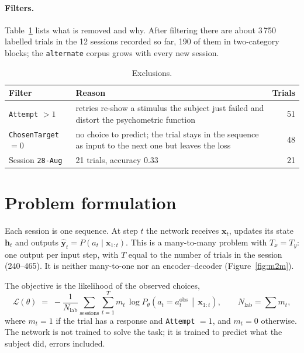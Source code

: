\documentclass[11pt,a4paper]{article}
\newcommand{\vect}[1]{\bm{#1}}
\begin{document}
\paragraph{Filters.} Table~\ref{tab:filters} lists what is removed and why. After
filtering there are about 3\,750 labelled trials in the 12 sessions recorded so far,
190 of them in two-category blocks; the \texttt{alternate} corpus grows with every new
session.

\begin{table}[H]
  \centering\small
  \caption{Exclusions.}
  \label{tab:filters}
  \begin{tabular}{lp{8.5cm}r}
    \toprule
    Filter & Reason & Trials \\
    \midrule
    \texttt{Attempt} $>1$ & retries re-show a stimulus the subject just failed and distort the psychometric function & 51 \\
    \texttt{ChosenTarget} $=0$ & no choice to predict; the trial stays in the sequence as input to the next one but leaves the loss & 48 \\
    Session \texttt{28-Aug} & 21 trials, accuracy 0.33 & 21 \\
    \bottomrule
  \end{tabular}
\end{table}

\section{Problem formulation}
\label{sec:formulation}

Each session is one sequence. At step $t$ the network receives $\vect{x}_t$, updates
its state $\vect{h}_t$ and outputs $\hat{\vect{y}}_t = P(a_t \mid \vect{x}_{1:t})$. This
is a many-to-many problem with $T_x = T_y$: one output per input step, with $T$ equal to
the number of trials in the session (240--465). It is neither many-to-one nor an
encoder--decoder (Figure~\ref{fig:m2m}).

The objective is the likelihood of the observed choices,
\begin{equation}
  \mathcal{L}(\theta) \;=\; -\frac{1}{N_{\mathrm{lab}}}
  \sum_{\text{sessions}} \sum_{t=1}^{T} m_t \,
  \log P_\theta\!\left(a_t = a_t^{\mathrm{obs}} \,\middle|\, \vect{x}_{1:t}\right),
  \qquad N_{\mathrm{lab}} = \sum m_t ,
  \label{eq:loss}
\end{equation}
where $m_t = 1$ if the trial has a response and \texttt{Attempt} $= 1$, and $m_t = 0$
otherwise. The network is not trained to solve the task; it is trained to predict what
the subject did, errors included.
\end{document}
